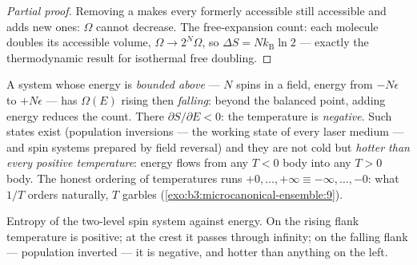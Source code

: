 \begin{proof}[Partial proof]
Removing a  makes every formerly accessible 
still accessible and adds new ones: $\Omega$ cannot decrease. The
free-expansion count: each molecule doubles its accessible volume,
$\Omega \to 2^N\Omega$, so $\Delta S = Nk_{\text{B}}\ln2$ ---
exactly the thermodynamic result for isothermal free doubling.
\end{proof}

\begin{example}\label{ex:b3:microcanonical-ensemble:negative}
A system whose energy is \emph{bounded above} --- $N$ spins in a
field, energy from $-N\epsilon$ to $+N\epsilon$ --- has $\Omega(E)$
rising then \emph{falling}: beyond the balanced point, adding energy
reduces the count. There $\partial S/\partial E < 0$: the
temperature is \emph{negative}. Such states exist (population
inversions --- the working state of every laser medium --- and
spin systems prepared by field reversal) and they are not cold but
\emph{hotter than every positive temperature}: energy flows from any
$T < 0$ body into any $T > 0$ body. The honest ordering of
temperatures runs $+0, \dots, +\infty \equiv -\infty, \dots, -0$:
what $1/T$ orders naturally, $T$ garbles
(\cref{exo:b3:microcanonical-ensemble:9}).
\end{example}

\begin{omfigure}

{\small Entropy of the two-level spin system against energy. On the
rising flank temperature is positive; at the crest it passes through
infinity; on the falling flank --- population inverted --- it is
negative, and hotter than anything on the left.}
\end{omfigure}

